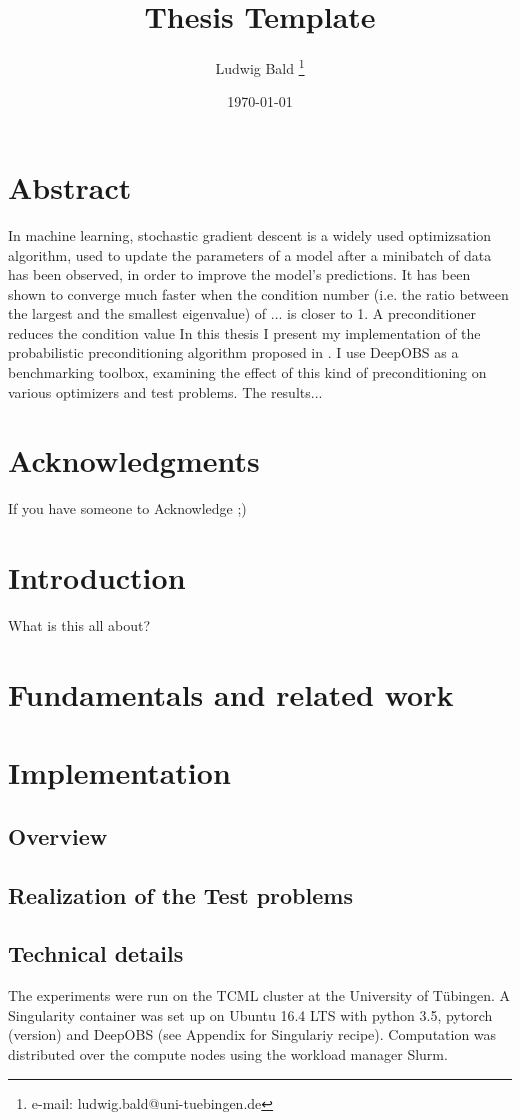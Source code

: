 \documentclass[a4paper,cleardoubleempty,BCOR1cm]{scrbook}
\title{Thesis Template}
\author{Ludwig Bald \thanks{e-mail: ludwig.bald@uni-tuebingen.de}}
\date{\today}
\begin{document}


\chapter*{Abstract}
In machine learning, stochastic gradient descent is a widely used optimizsation algorithm, used to update the parameters of a model after a minibatch of data has been observed, in order to improve the model's predictions. It has been shown to converge much faster when the condition number (i.e. the ratio between the largest and the smallest eigenvalue) of ... is closer to 1. A preconditioner reduces the condition value 
In this thesis I present my implementation of the probabilistic preconditioning algorithm proposed in \cite{de2019active}. I use DeepOBS  as a benchmarking toolbox, examining the effect of this kind of preconditioning on various optimizers and test problems. 
The results...


\chapter*{Acknowledgments}
If you have someone to Acknowledge ;)
\tableofcontents

\chapter{Introduction}
What is this all about?


\chapter{Fundamentals and related work}


\chapter{Implementation}

\section{Overview}

\section{Realization of the Test problems}

\section{Technical details}
The experiments were run on the TCML cluster at the University of Tübingen.
A Singularity container was set up on Ubuntu 16.4 LTS with python 3.5, pytorch (version) and DeepOBS (see Appendix for Singulariy recipe).
Computation was distributed over the compute nodes using the workload manager Slurm.
\end{document}
